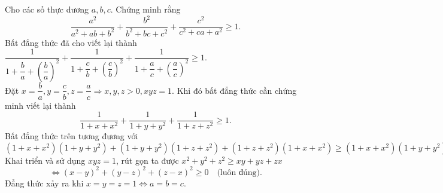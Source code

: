 \begin{ex}%
Cho các số thực dương $a, b, c$. Chứng minh rằng
$$\dfrac{a^2}{a^2+ab+b^2}+\dfrac{b^2}{b^2+bc+c^2}+\dfrac{c^2}{c^2+ca+a^2}\geq 1.$$
	\loigiai
	{ Bất đẳng thức đã cho viết lại thành $\dfrac{1}{1+\dfrac{b}{a}+\left(\dfrac{b}{a}\right)^2}+\dfrac{1}{1+\dfrac{c}{b}+\left(\dfrac{c}{b}\right)^2}+\dfrac{1}{1+\dfrac{a}{c}+\left(\dfrac{a}{c}\right)^2} \geq 1.$\\
		Đặt $x=\dfrac{b}{a}, y=\dfrac{c}{b}, z=\dfrac{a}{c} \Rightarrow x,y,z >0 , xyz=1$. Khi đó bất đẳng thức cần chứng minh viết lại thành $$\dfrac{1}{1+x+x^2}+\dfrac{1}{1+y+y^2}+\dfrac{1}{1+z+z^2}\geq 1.$$
		Bất đẳng thức trên tương đương với \\
		$(1+x+x^2)(1+y+y^2)+(1+y+y^2)(1+z+z^2)+(1+z+z^2)(1+x+x^2)\geq (1+x+x^2)(1+y+y^2)(1+z+z^2).$\\
		Khai triển và sử dụng $xyz=1$, rút gọn ta được $x^2+y^2+z^2\geq xy+yz+zx$
		$$\Leftrightarrow (x-y)^2+(y-z)^2+(z-x)^2 \geq 0 \quad \text{(luôn đúng).}$$
		Đẳng thức xảy ra khi $x=y=z=1 \Leftrightarrow a=b=c.$
 	}
\end{ex}

